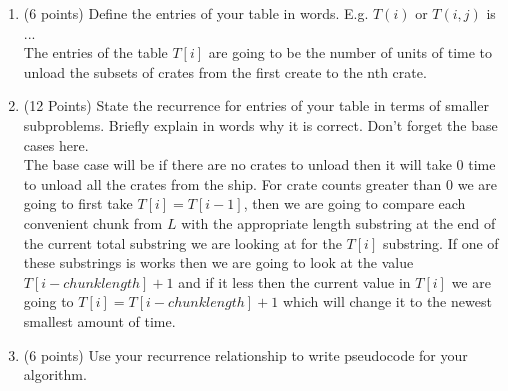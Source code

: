\documentclass{article}
\newcounter{ProblemCounter}
\newenvironment{problem}[1][Problem]{
 \begin{trivlist}
 \item[\hskip \labelsep {\bfseries #1}\hskip \labelsep {%
 \bfseries \theProblemCounter.%
 \stepcounter{ProblemCounter}%
 }]
}{
 \end{trivlist}
}
\begin{document}
\begin{problem}
\begin{enumerate}[label=\textbf{\alph*.)}]
    \item (6 points) Define the entries of your table in words. E.g. $T(i)$ or $T(i, j)$ is ...\\
    The entries of the table $T[i]$ are going to be the number of units of time to unload the subsets of crates from the first create to the nth crate.
    \item (12 Points) State the recurrence for entries of your table in terms of smaller subproblems. Briefly explain in words why it is correct. Don't forget the base cases here.\\
    The base case will be if there are no crates to unload then it will take 0 time to unload all the crates from the ship. For crate counts greater than $0$ we are going to first take $T[i] = T[i-1]$, then we are going to compare each convenient chunk from $L$ with the appropriate length substring at the end of the current total substring we are looking at for the $T[i]$ substring. If one of these substrings is works then we are going to look at the value $T[i-chunk length]+1$ and if it less then the current value in $T[i]$ we are going to $T[i] = T[i-chunk length] + 1$ which will change it to the newest smallest amount of time.
    \item (6 points) Use your recurrence relationship to write pseudocode for your algorithm.\\
    \begin{algorithm}[H]
    \end{algorithm}

\end{enumerate}
\end{problem}
\end{document}
